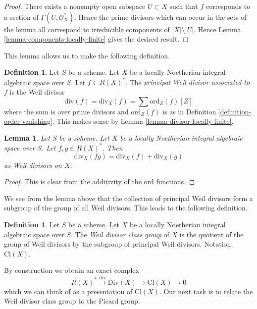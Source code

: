 \documentclass{stacks-project}
\theoremstyle{plain}
\newtheorem{lemma}[subsection]{Lemma}
\theoremstyle{definition}
\newtheorem{definition}[subsection]{Definition}
\theoremstyle{remark}
\numberwithin{equation}{subsection}
\begin{document}
\begin{proof}
There exists a nonempty open subspace $U \subset X$
such that $f$ corresponds to a section of $\Gamma(U, \mathcal{O}_X^*)$.
Hence the prime divisors which can occur in the sets of the lemma all
correspond to irreducible components of $|X| \setminus |U|$.
Hence Lemma \ref{lemma-components-locally-finite} gives the desired result.
\end{proof}

\noindent
This lemma allows us to make the following definition.

\begin{definition}
\label{definition-principal-divisor}
Let $S$ be a scheme.
Let $X$ be a locally Noetherian integral algebraic space over $S$.
Let $f \in R(X)^*$.
The {\it principal Weil divisor associated to $f$} is the Weil divisor
$$
\text{div}(f) = \text{div}_X(f) = \sum \text{ord}_Z(f) [Z]
$$
where the sum is over prime divisors and $\text{ord}_Z(f)$ is as in
Definition \ref{definition-order-vanishing}. This makes sense
by Lemma \ref{lemma-divisor-locally-finite}.
\end{definition}

\begin{lemma}
\label{lemma-div-additive}
Let $S$ be a scheme.
Let $X$ be a locally Noetherian integral algebraic space over $S$.
Let $f, g \in R(X)^*$. Then
$$
\text{div}_X(fg) = \text{div}_X(f) + \text{div}_X(g)
$$
as Weil divisors on $X$.
\end{lemma}

\begin{proof}
This is clear from the additivity of the $\text{ord}$ functions.
\end{proof}

\noindent
We see from the lemma above that the collection of principal Weil divisors
form a subgroup of the group of all Weil divisors. This leads to the following
definition.

\begin{definition}
\label{definition-class-group}
Let $S$ be a scheme.
Let $X$ be a locally Noetherian integral algebraic space over $S$. The
{\it Weil divisor class group} of $X$ is the quotient of
the group of Weil divisors by the subgroup of principal Weil divisors.
Notation: $\text{Cl}(X)$.
\end{definition}

\noindent
By construction we obtain an exact complex
\begin{equation}
\label{equation-Weil-divisor-class}
R(X)^* \xrightarrow{\text{div}} \text{Div}(X) \to \text{Cl}(X) \to 0
\end{equation}
which we can think of as a presentation of $\text{Cl}(X)$. Our next task
is to relate the Weil divisor class group to the Picard group.
\end{document}
